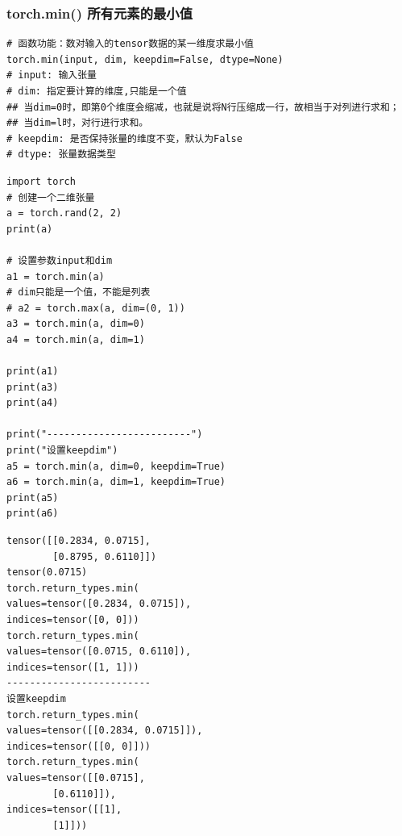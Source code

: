 \subsubsection{torch.min() 所有元素的最小值}
\begin{lstlisting}[style=demostyle,numbers=none]
# 函数功能：数对输入的tensor数据的某一维度求最小值
torch.min(input, dim, keepdim=False, dtype=None)
# input: 输入张量
# dim: 指定要计算的维度,只能是一个值
## 当dim=0时，即第0个维度会缩减，也就是说将N行压缩成一行，故相当于对列进行求和；
## 当dim=l时，对行进行求和。
# keepdim: 是否保持张量的维度不变，默认为False
# dtype: 张量数据类型
\end{lstlisting}
\begin{lstlisting}[style=pythonstyle]
import torch
# 创建一个二维张量
a = torch.rand(2, 2)
print(a)

# 设置参数input和dim
a1 = torch.min(a)
# dim只能是一个值，不能是列表
# a2 = torch.max(a, dim=(0, 1)) 
a3 = torch.min(a, dim=0)
a4 = torch.min(a, dim=1)

print(a1)
print(a3)
print(a4)

print("-------------------------")
print("设置keepdim")
a5 = torch.min(a, dim=0, keepdim=True)
a6 = torch.min(a, dim=1, keepdim=True)
print(a5)
print(a6)
\end{lstlisting}
\begin{lstlisting}[style=demostyle,numbers=none]
tensor([[0.2834, 0.0715],
        [0.8795, 0.6110]])
tensor(0.0715)
torch.return_types.min(
values=tensor([0.2834, 0.0715]),
indices=tensor([0, 0]))
torch.return_types.min(
values=tensor([0.0715, 0.6110]),
indices=tensor([1, 1]))
-------------------------
设置keepdim
torch.return_types.min(
values=tensor([[0.2834, 0.0715]]),
indices=tensor([[0, 0]]))
torch.return_types.min(
values=tensor([[0.0715],
        [0.6110]]),
indices=tensor([[1],
        [1]]))
\end{lstlisting}                

